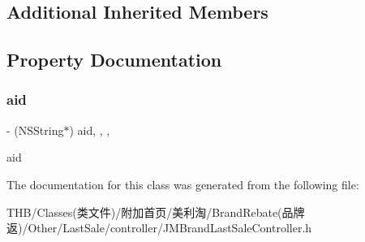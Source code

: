 \subsection*{Additional Inherited Members}


\subsection{Property Documentation}
\mbox{\label{interface_j_m_brand_last_sale_controller_aa8ddd735e8e2ff6ec7d61c32b864519d}} 
\subsubsection{\texorpdfstring{aid}{aid}}
{\footnotesize\ttfamily -\/ (N\+S\+String$\ast$) aid\hspace{0.3cm}{\ttfamily [read]}, {\ttfamily [write]}, {\ttfamily [nonatomic]}, {\ttfamily [copy]}}

aid 

The documentation for this class was generated from the following file\+:\begin{DoxyCompactItemize}
\item 
T\+H\+B/\+Classes(类文件)/附加首页/美利淘/\+Brand\+Rebate(品牌返)/\+Other/\+Last\+Sale/controller/J\+M\+Brand\+Last\+Sale\+Controller.\+h\end{DoxyCompactItemize}

